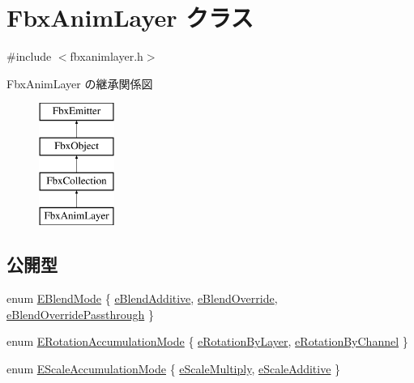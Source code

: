 \hypertarget{class_fbx_anim_layer}{}\section{Fbx\+Anim\+Layer クラス}
\label{class_fbx_anim_layer}


{\ttfamily \#include $<$fbxanimlayer.\+h$>$}

Fbx\+Anim\+Layer の継承関係図\begin{figure}[H]
\begin{center}
\leavevmode
\includegraphics[height=4.000000cm]{class_fbx_anim_layer}
\end{center}
\end{figure}
\subsection*{公開型}
\begin{DoxyCompactItemize}
\item 
enum \hyperlink{class_fbx_anim_layer_abb1e650203e91ff090773239994e802a}{E\+Blend\+Mode} \{ \hyperlink{class_fbx_anim_layer_abb1e650203e91ff090773239994e802aae60dd39593c8806694f8cedb0c14b09b}{e\+Blend\+Additive}, 
\hyperlink{class_fbx_anim_layer_abb1e650203e91ff090773239994e802aaf8232b445a780774bcb8b76ee37291e5}{e\+Blend\+Override}, 
\hyperlink{class_fbx_anim_layer_abb1e650203e91ff090773239994e802aa9551a7380fccde36fd35f532aa826a7a}{e\+Blend\+Override\+Passthrough}
 \}
\item 
enum \hyperlink{class_fbx_anim_layer_a11bad6dbac61cc3965624a0622e90b38}{E\+Rotation\+Accumulation\+Mode} \{ \hyperlink{class_fbx_anim_layer_a11bad6dbac61cc3965624a0622e90b38a51036262864495602654d22f83f101da}{e\+Rotation\+By\+Layer}, 
\hyperlink{class_fbx_anim_layer_a11bad6dbac61cc3965624a0622e90b38a5212817a9e2cfdd21688930bd5fc167a}{e\+Rotation\+By\+Channel}
 \}
\item 
enum \hyperlink{class_fbx_anim_layer_aec9cfaa528bee6739ba4317964d123b0}{E\+Scale\+Accumulation\+Mode} \{ \hyperlink{class_fbx_anim_layer_aec9cfaa528bee6739ba4317964d123b0af962df864ef1dead2f88ade13f4262d0}{e\+Scale\+Multiply}, 
\hyperlink{class_fbx_anim_layer_aec9cfaa528bee6739ba4317964d123b0a0d79b9c4219c50d434746d7062046123}{e\+Scale\+Additive}
 \}
\end{DoxyCompactItemize}
